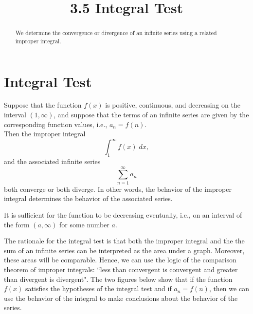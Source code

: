 \documentclass[handout]{ximera}
\title{3.5 Integral Test}
\begin{document}
\begin{abstract}
We determine the convergence or divergence of an infinite series using a related improper integral.
\end{abstract}

\maketitle

\section{Integral Test}

\begin{theorem}
Suppose that the function $f(x)$ is positive, continuous, and decreasing on the interval $(1, \infty)$, and 
suppose that the terms of an infinite series
are given by the corresponding function values, i.e., $a_n = f(n)$. \\
Then the improper integral
\[
\int_1^\infty f(x) \; dx,
\]
and the associated infinite series
\[
\sum_{n=1}^\infty a_n
\]
both converge or both diverge. In other words, the behavior of the improper integral 
determines the behavior of the associated series.
\end{theorem}

\begin{remark}
It is sufficient for the function to be decreasing eventually, i.e., on an interval of the form $(a, \infty)$
for some number $a$.
\end{remark}

The rationale for the integral test is that both the improper integral and the the sum of an infinite series can be interpreted as the area under a graph.
Moreover, these areas will be comparable.
Hence, we can use the logic of the comparison theorem of improper integrals: ``less than convergent is convergent and greater 
than divergent is divergent". 
The two figures below show that if 
the function $f(x)$ satisfies the hypotheses of the integral test and if  $a_n = f(n)$, 
then we can use the behavior of the integral to make conclusions about the behavior of the series.
\end{document}
